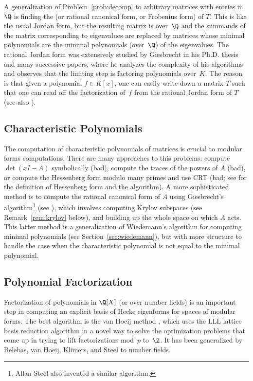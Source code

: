 \begin{remark}\label{rem:rjf}
A generalization of Problem~\ref{prob:decomp} 
to arbitrary matrices with entries in $\Q$ is
finding the  (or rational canonical
form, or Frobenius form) of $T$.
This is like the usual Jordan form, but the resulting matrix is
over~$\Q$ and the summands of the matrix corresponding to
eigenvalues are replaced by matrices whose minimal polynomials
are the minimal polynomials (over~$\Q$) of the eigenvalues.  The
rational Jordan form was extensively studied by Giesbrecht in his
Ph.D. thesis and many successive papers, where he analyzes the
complexity of his algorithms and observes that the limiting step is
factoring polynomials over~$K$.  The reason is that given a polynomial
$f\in K[x]$, one can easily write down a matrix $T$ such that one can
read off the factorization of~$f$ from the rational Jordan form of
$T$ (see also \cite{steel:canonical}).
\end{remark}

\subsection{Characteristic Polynomials}
The computation of characteristic polynomials of matrices is crucial to
modular forms computations.  There are many approaches to this
problems: compute $\det(xI-A)$ symbolically (bad), compute the traces
of the powers of $A$ (bad), or compute the Hessenberg form modulo many
primes and use CRT (bad; see for \cite[\S2.2.4]{cohen:course_ant} the
definition of Hessenberg form and the algorithm).  A more
sophisticated method is to compute the rational canonical form of $A$
using Giesbrecht's algorithm\footnote{Allan Steel also
  invented a similar algorithm.} (see \cite{giesbrecht-storjohann}),
which involves computing Krylov subspaces 
(see Remark~\ref{rem:krylov} below), and building up the whole
space on which $A$ acts.  This latter method is a generalization of
Wiedemann's algorithm for computing minimal polynomials (see
Section~\ref{sec:wiedemann}), but with more structure to handle the
case when the characteristic polynomial is not equal to the minimal
polynomial.

\subsection{Polynomial Factorization}\label{sec:polyfac}
Factorization of polynomials in $\Q[X]$ (or over number fields) is an
important step in computing an explicit basis of Hecke eigenforms for
spaces of modular forms.  The best algorithm is the van Hoeij method
\cite{hoeij:nf},
which uses the LLL lattice basis reduction algorithm \cite{lll} in a
novel way to solve the optimization problems that come up in trying to
lift factorizations mod~$p$ to~$\Z$. 
It has been generalized by Belebas, van Hoeij, Kl\"uners, and Steel
to number fields.




